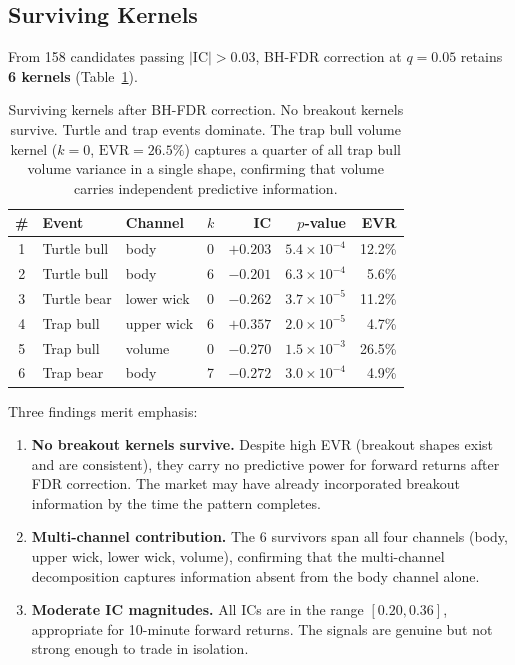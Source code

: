 \documentclass[11pt,a4paper]{article}
\theoremstyle{definition}
\theoremstyle{plain}
\begin{document}
\subsection{Surviving Kernels}

From 158 candidates passing $|\mathrm{IC}| > 0.03$, BH-FDR correction at
$q = 0.05$ retains \textbf{6 kernels} (Table~\ref{tab:survivors}).

\begin{table}[ht]
\begin{center}
\small
\begin{tabular}{clllrrr}
\hline
\# & \textbf{Event} & \textbf{Channel} & \textbf{$k$} & \textbf{IC} & \textbf{$p$-value} & \textbf{EVR} \\
\hline
1 & Turtle bull  & body        & 0 & $+0.203$ & $5.4 \times 10^{-4}$ & 12.2\% \\
2 & Turtle bull  & body        & 6 & $-0.201$ & $6.3 \times 10^{-4}$ & 5.6\%  \\
3 & Turtle bear  & lower wick  & 0 & $-0.262$ & $3.7 \times 10^{-5}$ & 11.2\% \\
4 & Trap bull    & upper wick  & 6 & $+0.357$ & $2.0 \times 10^{-5}$ & 4.7\%  \\
5 & Trap bull    & volume      & 0 & $-0.270$ & $1.5 \times 10^{-3}$ & 26.5\% \\
6 & Trap bear    & body        & 7 & $-0.272$ & $3.0 \times 10^{-4}$ & 4.9\%  \\
\hline
\end{tabular}
\end{center}
\caption{Surviving kernels after BH-FDR correction. No breakout kernels
survive. Turtle and trap events dominate. The trap bull volume kernel
($k=0$, $\mathrm{EVR} = 26.5\%$) captures a quarter of all trap bull
volume variance in a single shape, confirming that volume carries
independent predictive information.}
\label{tab:survivors}
\end{table}

Three findings merit emphasis:

\begin{enumerate}
\item \textbf{No breakout kernels survive.} Despite high EVR (breakout
      shapes exist and are consistent), they carry no predictive power for
      forward returns after FDR correction. The market may have already
      incorporated breakout information by the time the pattern completes.

\item \textbf{Multi-channel contribution.} The 6 survivors span all four
      channels (body, upper wick, lower wick, volume), confirming that the
      multi-channel decomposition captures information absent from the body
      channel alone.

\item \textbf{Moderate IC magnitudes.} All ICs are in the range
      $[0.20, 0.36]$, appropriate for 10-minute forward returns. The signals
      are genuine but not strong enough to trade in isolation.
\end{enumerate}
\end{document}
